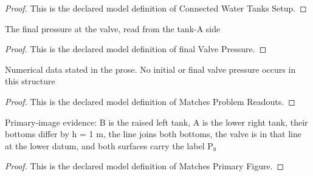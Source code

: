 \begin{proof}
  This is the declared model definition of Connected Water Tanks Setup.
\end{proof}
\begin{definition}
  \label{def:physics:phyx-mini-0389:phyxminiproblems-problemphyxmini0389-finalvalvepressure}
  The final pressure at the valve, read from the tank-A side
\end{definition}
\begin{proof}
  This is the declared model definition of final Valve Pressure.
\end{proof}
\begin{definition}
  \label{def:physics:phyx-mini-0389:phyxminiproblems-problemphyxmini0389-matchesproblemreadouts}
  Numerical data stated in the prose. No initial or final valve pressure occurs in this structure
\end{definition}
\begin{proof}
  This is the declared model definition of Matches Problem Readouts.
\end{proof}
\begin{definition}
  \label{def:physics:phyx-mini-0389:phyxminiproblems-problemphyxmini0389-matchesprimaryfigure}
  Primary-image evidence: B is the raised left tank, A is the lower right tank, their bottoms differ by h = 1 m, the line joins both bottoms, the valve is in that line at the lower datum, and both surfaces carry the label P₀
\end{definition}
\begin{proof}
  This is the declared model definition of Matches Primary Figure.
\end{proof}
